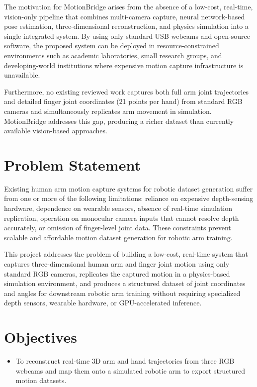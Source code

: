 The motivation for MotionBridge arises from the absence of a low-cost, real-time, vision-only pipeline that combines multi-camera capture, neural network-based pose estimation, three-dimensional reconstruction, and physics simulation into a single integrated system. By using only standard USB webcams and open-source software, the proposed system can be deployed in resource-constrained environments such as academic laboratories, small research groups, and developing-world institutions where expensive motion capture infrastructure is unavailable.
 
Furthermore, no existing reviewed work captures both full arm joint trajectories and detailed finger joint coordinates (21 points per hand) from standard RGB cameras and simultaneously replicates arm movement in simulation. MotionBridge addresses this gap, producing a richer dataset than currently available vision-based approaches.

\section{Problem Statement}
Existing human arm motion capture systems for robotic dataset generation suffer from one or more of the following limitations: reliance on expensive depth-sensing hardware, dependence on wearable sensors, absence of real-time simulation replication, operation on monocular camera inputs that cannot resolve depth accurately, or omission of finger-level joint data. These constraints prevent scalable and affordable motion dataset generation for robotic arm training.
 
This project addresses the problem of building a low-cost, real-time system that captures three-dimensional human arm and finger joint motion using only standard RGB cameras, replicates the captured motion in a physics-based simulation environment, and produces a structured dataset of joint coordinates and angles for downstream robotic arm training without requiring specialized depth sensors, wearable hardware, or GPU-accelerated inference. 

\section{Objectives}
\begin{itemize}
    \item To reconstruct real-time 3D arm and hand trajectories from three RGB webcams and map them onto a simulated robotic arm to export structured motion datasets.
\end{itemize}



